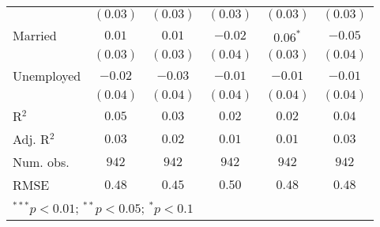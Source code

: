 \begin{table}
\begin{center}
\begin{tabular}{l c c c c c}
              & $(0.03)$      & $(0.03)$      & $(0.03)$     & $(0.03)$    & $(0.03)$      \\
Married       & $0.01$        & $0.01$        & $-0.02$      & $0.06^{*}$  & $-0.05$       \\
              & $(0.03)$      & $(0.03)$      & $(0.04)$     & $(0.03)$    & $(0.04)$      \\
Unemployed    & $-0.02$       & $-0.03$       & $-0.01$      & $-0.01$     & $-0.01$       \\
              & $(0.04)$      & $(0.04)$      & $(0.04)$     & $(0.04)$    & $(0.04)$      \\
\midrule
R$^2$         & $0.05$        & $0.03$        & $0.02$       & $0.02$      & $0.04$        \\
Adj. R$^2$    & $0.03$        & $0.02$        & $0.01$       & $0.01$      & $0.03$        \\
Num. obs.     & $942$         & $942$         & $942$        & $942$       & $942$         \\
RMSE          & $0.48$        & $0.45$        & $0.50$       & $0.48$      & $0.48$        \\
\bottomrule
\multicolumn{6}{l}{\scriptsize{$^{***}p<0.01$; $^{**}p<0.05$; $^{*}p<0.1$}}
\end{tabular}
\label{tab_risk_week}
\end{center}
\end{table}

